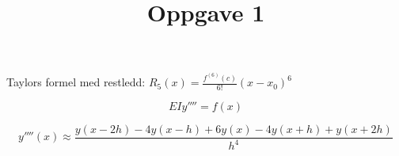 \documentclass[11pt]{article}
\title{Oppgave 1}
\begin{document}
    \begin{flushleft}
        Taylors formel med restledd:
        $R_5(x)= \frac{f^{(6)}(c)} {6!}(x-x_0)^6$
        
        \[
        EIy''''=f(x)
        \]
        
        \[
            y''''(x) \approx \frac{y(x - 2h)-4y(x - h)+ 6y(x) - 4y(x + h) + y(x + 2h)}{h^4}
        \]
        

    \end{flushleft}
\end{document}
